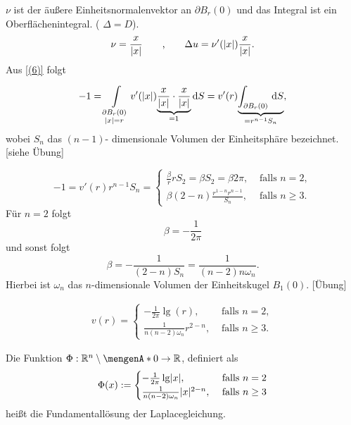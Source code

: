 $\nu$ ist der äußere Einheitsnormalenvektor an $\partial B_r(0)$ und das Integral ist ein Oberflächenintegral. ( $ \Delta = D$). \\
\[
	\nu = \frac{x}{\lvert x\rvert} \qquad \text{,} \qquad \Delta u = \nu'(\lvert x\rvert) \frac{x}{\lvert x\rvert}.
\]
Aus \eqref{(6)} folgt 
\begin{equation}
	-1 = \int\limits_{\substack{\partial B_r(0)\\ \lvert x\rvert=r}}^{} v'(\lvert x\rvert) \underset{=1}{\underbrace{\frac{x}{\lvert x\rvert} \cdot \frac{x}{\lvert x\rvert}}} \,\mathrm{d}S  
	= v'(r) \underset{= r^{n-1}S_n}{\underbrace{\int_{\partial B_r(0)}^{} \,\mathrm{d}S }},
\end{equation}
wobei $S_n$ das $(n-1)$- dimensionale Volumen der Einheitsphäre bezeichnet. [siehe Übung]

\begin{equation}
	-1 = v'(r) r^{n-1} S_n = \begin{cases}
		\frac{\beta}{r}r S_2 = \beta S_2 = \beta 2 \pi, &\text{ falls } n=2,\\
		\beta (2-n) \frac{r^{1-n}r^{n-1} }{  S_n}, &\text{ falls } n \geq 3.
	\end{cases}
\end{equation}
Für $n=2$ folgt
\[
	\beta = - \frac{1}{2 \pi}
\] 
und sonst folgt
\[
	\beta = -\frac{1}{(2-n)S_n} = \frac{1}{(n-2)n\omega_n}.
\]
Hierbei ist $\omega_n$ das $n$-dimensionale Volumen der Einheitskugel $B_1(0)$. [Übung]

\begin{align*}
	v(r) = \begin{cases}
		-\frac{1}{2 \pi} \lg(r), &\text{ falls }n=2,\\
		\frac{1}{n (n-2) \omega_n } r^{2-n}, &\text{ falls }n \geq 3.
	\end{cases}
\end{align*}

\begin{definition}
	Die Funktion $\Phi: \mathbb{R}^n \setminus \set{0} \to \mathbb{R}$, definiert als
	\begin{equation}
		\Phi(x) := \begin{cases}
			-\frac{1}{2 \pi} \lg \lvert x\rvert, &\text{ falls }n=2\\
			\frac{1}{n (n-2) \omega_n } \lvert x\rvert^{2-n}, &\text{ falls }n \geq 3
		\end{cases}
	\end{equation}
	heißt die Fundamentallösung der Laplacegleichung.
\end{definition}

